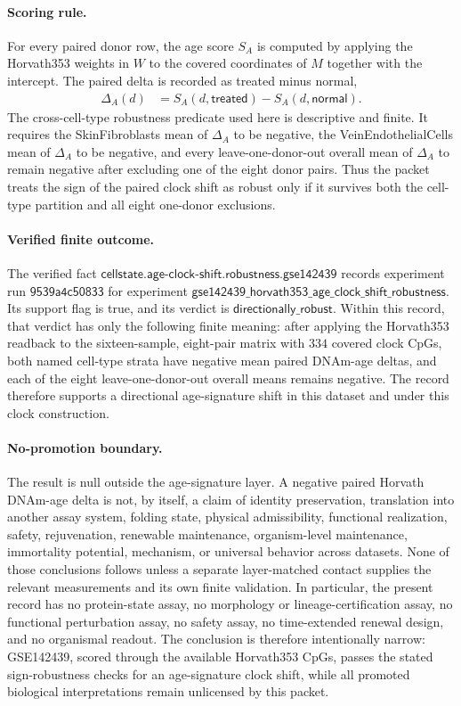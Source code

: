\paragraph{Scoring rule.}
For every paired donor row, the age score $S_A$ is computed by applying the Horvath353 weights in $W$ to the covered coordinates of $M$ together with the intercept. The paired delta is recorded as treated minus normal,
$$
\begin{aligned}
\Delta_A(d) &= S_A(d,\mathsf{treated})-S_A(d,\mathsf{normal}).
\end{aligned}
$$
The cross-cell-type robustness predicate used here is descriptive and finite. It requires the SkinFibroblasts mean of $\Delta_A$ to be negative, the VeinEndothelialCells mean of $\Delta_A$ to be negative, and every leave-one-donor-out overall mean of $\Delta_A$ to remain negative after excluding one of the eight donor pairs. Thus the packet treats the sign of the paired clock shift as robust only if it survives both the cell-type partition and all eight one-donor exclusions.

\paragraph{Verified finite outcome.}
The verified fact $\mathsf{cellstate.age\mbox{-}clock\mbox{-}shift.robustness.gse142439}$ records experiment run $\mathsf{9539a4c50833}$ for experiment $\mathsf{gse142439\_horvath353\_age\_clock\_shift\_robustness}$. Its support flag is true, and its verdict is $\mathsf{directionally\_robust}$. Within this record, that verdict has only the following finite meaning: after applying the Horvath353 readback to the sixteen-sample, eight-pair matrix with $334$ covered clock CpGs, both named cell-type strata have negative mean paired DNAm-age deltas, and each of the eight leave-one-donor-out overall means remains negative. The record therefore supports a directional age-signature shift in this dataset and under this clock construction.

\paragraph{No-promotion boundary.}
The result is null outside the age-signature layer. A negative paired Horvath DNAm-age delta is not, by itself, a claim of identity preservation, translation into another assay system, folding state, physical admissibility, functional realization, safety, rejuvenation, renewable maintenance, organism-level maintenance, immortality potential, mechanism, or universal behavior across datasets. None of those conclusions follows unless a separate layer-matched contact supplies the relevant measurements and its own finite validation. In particular, the present record has no protein-state assay, no morphology or lineage-certification assay, no functional perturbation assay, no safety assay, no time-extended renewal design, and no organismal readout. The conclusion is therefore intentionally narrow: GSE142439, scored through the available Horvath353 CpGs, passes the stated sign-robustness checks for an age-signature clock shift, while all promoted biological interpretations remain unlicensed by this packet.

